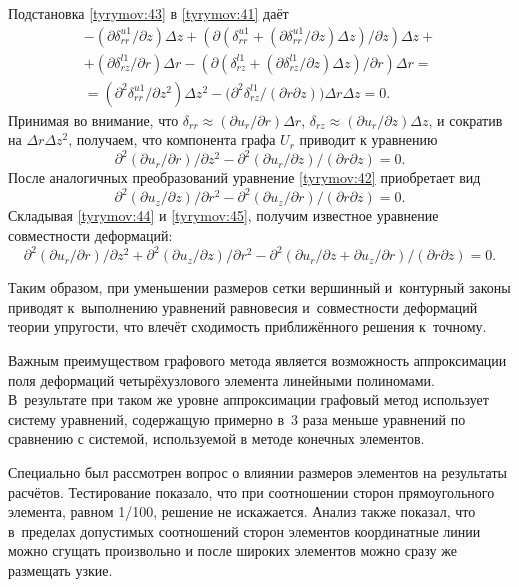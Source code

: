 Подстановка \eqref{tyrymov:43} в \eqref{tyrymov:41} даёт
\begin{multline*}
-(\partial \delta_{rr}^{u1}/\partial z)\Delta 
z+(\partial(\delta_{rr}^{u1}+(\partial \delta_{rr}^{u1}/\partial
z)\Delta z)/\partial z)\Delta z+ \\ 
+ (\partial \delta_{rz}^{l1}/\partial r)\Delta  r  -(\partial(\delta_{rz}^{l1}+(\partial \delta_{rz}^{l1}/\partial
z)\Delta z)/\partial r)\Delta  r = \\ =(\partial^2 \delta_{rr}^{u1}/\partial z^2)\Delta 
z^2-\bigl(\partial^2\delta_{rz}^{l1}/(\partial r\partial z)\bigr)\Delta 
r\Delta  z=0.
\end{multline*}
Принимая во внимание, что $\delta_{rr}\approx (\partial
u_r/\partial r)\Delta  r$, $\delta_{rz}\approx (\partial u_r/\partial z)\Delta  z $, и сократив на $\Delta  r \Delta 
z^2$, получаем, что компонента графа $U_r$ приводит к уравнению
\begin{equation}\label{tyrymov:44}
    \partial^2(\partial u_r /\partial r)/\partial z^2-
    \partial^2(\partial u_r /\partial z)/ (\partial r \partial     z)=0.
\end{equation}
После аналогичных преобразований уравнение \eqref{tyrymov:42} приобретает вид
\begin{equation}\label{tyrymov:45}
    \partial^2(\partial u_z/\partial z)/\partial r^2-
     \partial^2(\partial u_z/\partial r)/(\partial r \partial z)=0.
\end{equation}
Складывая \eqref{tyrymov:44} и \eqref{tyrymov:45}, получим известное уравнение совместности деформаций:
$$
\partial^2(\partial u_r /\partial r)/\partial z^2+
\partial^2(\partial u_z /\partial z)/\partial r^2-
\partial^2(\partial u_r /\partial z+\partial u_z /\partial r)/ (\partial r\partial z)=0.
   $$
   
Таким образом, при уменьшении размеров сетки вершинный и~контурный законы приводят к~выполнению уравнений равновесия и~совместности деформаций теории упругости, что влечёт сходимость приближённого решения к~точному.

Важным преимуществом графового метода является возможность аппроксимации поля деформаций четырёхузлового элемента линейными полиномами. 
В~результате при таком же уровне аппроксимации графовый метод использует систему уравнений, содержащую примерно в~3 раза меньше уравнений по сравнению с системой, используемой в методе конечных элементов.

Специально был рассмотрен вопрос о влиянии размеров элементов на результаты расчётов. 
Тестирование показало, что при соотношении сторон прямоугольного элемента, равном  1/100, решение не искажается. 
Анализ также показал, что в~пределах допустимых соотношений сторон элементов координатные линии можно сгущать произвольно и после широких элементов можно сразу же размещать узкие.

